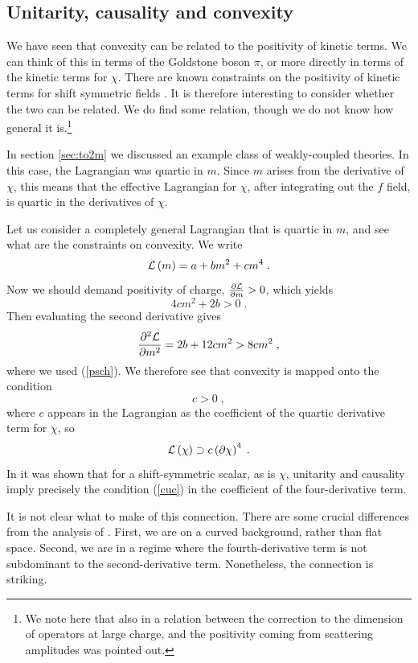 \documentclass[11pt]{article}
\numberwithin{equation}{section}
\newcommand{\be}{\begin{equation}} \newcommand{\ee}{\end{equation}}
\begin{document}
\subsection{Unitarity, causality and convexity}
\label{sec:UC}

We have seen that convexity can be related to the positivity of kinetic terms. We can think of this in terms of the Goldstone boson $\pi$, or more directly in terms of the kinetic terms for $\chi$. There are known constraints on the positivity of kinetic terms for shift symmetric fields \cite{Adams:2006sv}. It is therefore interesting to consider whether the two can be related. We do find some relation, though we do not know how general it is.\footnote{We note here that also in \cite{Hellerman:2017veg} a relation between the correction to the dimension of operators at large charge, and the positivity coming from scattering amplitudes was pointed out.}

In section \ref{sec:to2m} we discussed an example class of weakly-coupled theories. In this case, the Lagrangian was quartic in $m$. Since $m$ arises from the derivative of $\chi$, this means that the effective Lagrangian for $\chi$, after integrating out the $f$ field, is quartic in the derivatives of $\chi$. 

Let us consider a completely general Lagrangian that is quartic in $m$, and see what are the constraints on convexity. We write
\be
{\cal L}\left(m\right) = a + b m^2 + c m^4 \;.
\ee
Now we should demand positivity of charge, $\frac{\partial {\cal L}}{\partial m}>0$, which yields
\be
4 c m^2 + 2b > 0 \;.
\label{psch}
\ee 
Then evaluating the second derivative gives
\be
\frac{\partial^2{\cal L}}{\partial m^2}  = 2b + 12 c m^2 > 8 c m^2 \;,
\ee
where we used (\ref{psch}). We therefore see that convexity is mapped onto the condition 
\be
c > 0 \;,
\label{cuc}
\ee
where $c$ appears in the Lagrangian as the coefficient of the quartic derivative term for $\chi$, so
\be
{\cal L}\left(\chi\right) \supset c\left(\partial \chi \right)^4 \;.
\ee
In \cite{Adams:2006sv} it was shown that for a shift-symmetric scalar, as is $\chi$, unitarity and causality imply precisely the condition (\ref{cuc}) in the coefficient of the four-derivative term. 

It is not clear what to make of this connection. There are some crucial differences from the analysis of \cite{Adams:2006sv}. First, we are on a curved background, rather than flat space. Second, we are in a regime where the fourth-derivative term is not subdominant to the second-derivative term. Nonetheless, the connection is striking. 
\end{document}
